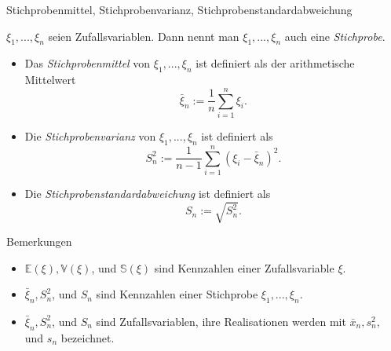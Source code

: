 \documentclass[
  8pt,
  ignorenonframetext,
]{beamer}
\providecommand{\tightlist}{%
  \setlength{\itemsep}{0pt}\setlength{\parskip}{0pt}}
\begin{document}
\begin{frame}{Stichprobenmittel, Stichprobenvarianz,
Stichprobenstandardabweichung}
\protect\hypertarget{stichprobenmittel-stichprobenvarianz-stichprobenstandardabweichung}{}
\footnotesize
\begin{definition}
$\xi_1,...,\xi_n$ seien Zufallsvariablen. Dann nennt man $\xi_1,...,\xi_n$ auch eine \textit{Stichprobe}.
\begin{itemize}
\item Das \textit{Stichprobenmittel} von $\xi_1,...,\xi_n$ ist definiert als der arithmetische Mittelwert
\begin{equation}
\bar{\xi}_n := \frac{1}{n}\sum_{i=1}^n \xi_i.
\end{equation}
\item Die \textit{Stichprobenvarianz} von $\xi_1,...,\xi_n$ ist definiert als
\begin{equation}
S_n^2 := \frac{1}{n-1}\sum_{i=1}^n (\xi_i - \bar{\xi}_n)^2.
\end{equation}
\item  Die \textit{Stichprobenstandardabweichung} ist definiert als
\begin{equation}
S_n := \sqrt{S_n^2}.
\end{equation}
\end{itemize}
\end{definition}
\vspace{-2mm}
\footnotesize

Bemerkungen

\begin{itemize}
\tightlist
\item
  \(\mathbb{E}(\xi),\mathbb{V}(\xi)\), und \(\mathbb{S}(\xi)\) sind
  Kennzahlen einer Zufallsvariable \(\xi\).
\item
  \(\bar{\xi}_n, S_n^2\), und \(S_n\) sind Kennzahlen einer Stichprobe
  \(\xi_1,...,\xi_n\).
\item
  \(\bar{\xi}_n, S_n^2\), und \(S_n\) sind Zufallsvariablen, ihre
  Realisationen werden mit \(\bar{x}_n, s_n^2,\) und \(s_n\) bezeichnet.
\end{itemize}
\end{frame}
\end{document}
